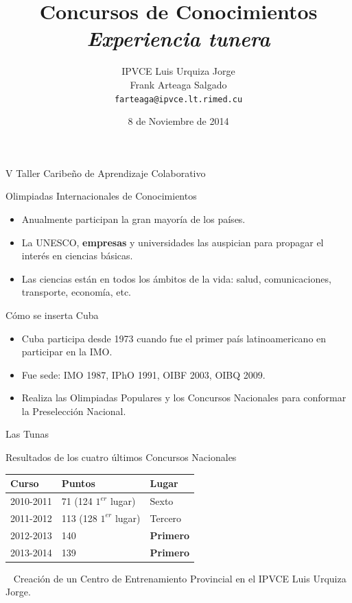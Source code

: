 \documentclass{beamer}
\title[Concursos de Conocimientos:\textit{Experiencia tunera}]{{\Huge Concursos de Conocimientos}\\\textit{\LARGE Experiencia tunera}}
\author[IV TCAC Frank Arteaga Salgado]{\Large IPVCE Luis Urquiza Jorge\\{\Large Frank Arteaga Salgado}\\\texttt{\small farteaga@ipvce.lt.rimed.cu}}
\date{\small 8 de Noviembre de 2014}
\begin{document}
\begin{frame}
{\Large V Taller Caribe\~no de Aprendizaje Colaborativo }
 \titlepage
\end{frame}


\begin{frame}{\LARGE Olimpiadas Internacionales de Conocimientos}
\LARGE
  \begin{itemize}
    \item<1-> Anualmente participan la gran mayor\'ia de los pa\'ises.
	
    \item<2->  La UNESCO, \textbf{empresas} y universidades las auspician para propagar
el inter\'es en ciencias b\'asicas.

     \item<3-> Las ciencias est\'an en todos los \'ambitos
de la vida: salud, comunicaciones, transporte, econom\'ia, etc.
  \end{itemize}
\end{frame}


\begin{frame}{\LARGE C\'omo se inserta Cuba}
\Large
\begin{itemize}
 \LARGE
  \item Cuba participa desde 1973 cuando fue el primer pa\'is latinoamericano
  en participar en la IMO.
  \pause
  \item Fue sede: IMO 1987, IPhO 1991, OIBF 2003, OIBQ 2009.
  \pause
  \item Realiza las Olimpiadas Populares y los Concursos Nacionales para conformar la
  Preselecci\'on Nacional.
\end{itemize}  
\end{frame}

\begin{frame}{\LARGE Las Tunas}
\Large
\begin{block}{Resultados de los cuatro \'ultimos Concursos Nacionales}
\pause
\begin{center}
\begin{tabular}{|l|l|l|}
\hline
 Curso & Puntos & Lugar\\\hline
2010-2011 & 71 (124 $1^{er}$ lugar) & Sexto\\\hline
2011-2012  & 113 (128 $1^{er}$ lugar) & Tercero\\\hline
2012-2013  & 140 & \textbf{Primero}\\\hline
2013-2014 & 139 & \textbf{Primero} \\\hline
\end{tabular}  
\end{center}
\end{block}  

\pause    
\begin{block}{\ }
	\LARGE Creaci\'on de un Centro de Entrenamiento Provincial en el IPVCE Luis Urquiza Jorge.
\end{block}
\end{frame}
\end{document}
